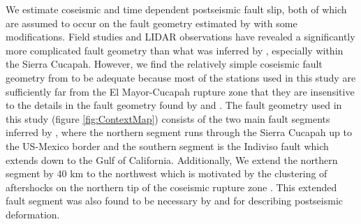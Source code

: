 \documentclass[1p]{elsarticle}
\begin{document}
We estimate coseismic and time dependent postseismic fault slip, both of which are assumed to occur on the fault geometry estimated by \citet{Wei2011} with some modifications.  Field studies \citep{Fletcher2014} and LIDAR observations \citep{Oskin2012} have revealed a significantly more complicated fault geometry than what was inferred by \citet{Wei2011}, especially within the Sierra Cucapah.  However, we find the relatively simple coseismic fault geometry from \cite{Wei2011} to be adequate because most of the stations used in this study are sufficiently far from the El Mayor-Cucapah rupture zone that they are insensitive to the details in the fault geometry found by \cite{Fletcher2014} and \cite{Oskin2012}.  The fault geometry used in this study (figure \ref{fig:ContextMap}) consists of the two main fault segments inferred by \cite{Wei2011}, where the northern segment runs through the Sierra Cucapah up to the US-Mexico border and the southern segment is the Indiviso fault which extends down to the Gulf of California.  Additionally, We extend the northern segment by 40 km to the northwest which is motivated by the clustering of aftershocks on the northern tip of the coseismic rupture zone \citep{Hauksson2011,Kroll2013}.  This extended fault segment was also found to be necessary by \cite{Rollins2015} and \cite{Pollitz2012} for describing postseismic deformation.     
\end{document}
